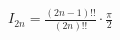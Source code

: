 \documentclass[preview]{standalone}
\begin{document}
\begin{center}
$I_{2n} = \frac{(2n-1)!!}{(2n)!!} \cdot \frac{\pi}{2}$
\end{center}
\end{document}
